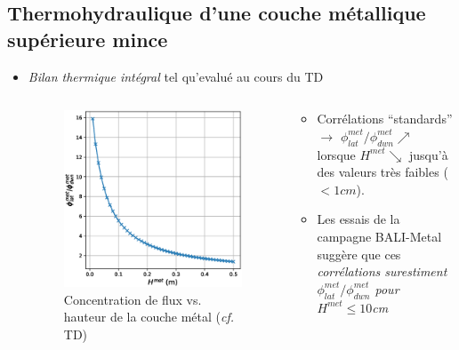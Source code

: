 \subsection{Thermohydraulique d'une couche métallique supérieure mince}
\begin{frame}[fragile]
	\begin{itemize}
	\item \emph{Bilan thermique intégral} tel qu'evalué au cours du TD
	\begin{columns}[T]
		\begin{column}{0.25\textwidth}
	\begin{figure}[H]
	\centering \includegraphics[width=\textwidth]{Figures/Varying_Hmet_2.eps} \\
	{\tiny Concentration de flux vs. hauteur de la couche métal (\textit{cf.} TD)}
	\end{figure}
		\end{column}
		\begin{column}{0.75\textwidth}
	\begin{itemize}
	\item Corrélations ``standards'' $\rightarrow$ $\phi^{met}_{lat}/\phi^{met}_{dwn} \nearrow$ lorsque $H^{met} \searrow$ jusqu'à des valeurs très faibles ($<1cm$).
	\item Les essais de la campagne BALI-Metal suggère que ces \emph{corrélations surestiment $\phi^{met}_{lat}/\phi^{met}_{dwn}$ pour $H^{met} \le 10$cm}

\end{itemize}
\end{column}
\end{columns}
\end{itemize}
\end{frame}
